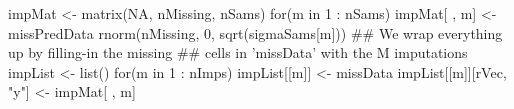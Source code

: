 \begin{Schunk}
\begin{Sinput}
 impMat <- matrix(NA, nMissing, nSams)
 for(m in 1 : nSams) {
   impMat[ , m] <-
     missPredData %*% matrix(betaSams[m, ]) +
           rnorm(nMissing, 0, sqrt(sigmaSams[m]))
 }
 ## We wrap everything up by filling-in the missing
 ## cells in 'missData' with the M imputations
 impList <- list()
 for(m in 1 : nImps) {
   impList[[m]] <- missData
   impList[[m]][rVec, "y"] <- impMat[ , m]
 }
\end{Sinput}
\end{Schunk}

